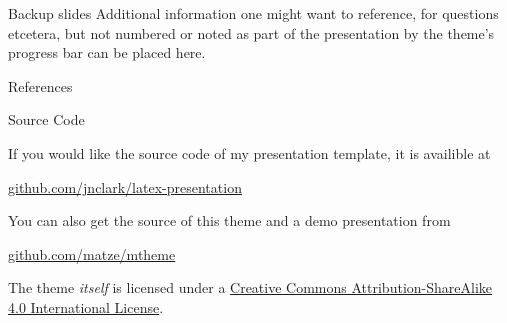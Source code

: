 \documentclass[10pt]{beamer}
\begin{document}
\appendix

\begin{frame}[fragile]{Backup slides}
  Additional information one might want to reference, for questions etcetera, but not numbered or noted as part of the presentation by the theme's progress bar can be placed here.
\end{frame}

\begin{frame}[allowframebreaks]{References}

  
  

\end{frame}

\begin{frame}{Source Code}

  If you would like the source code of my presentation template, it is availible at 

\begin{center}\url{github.com/jnclark/latex-presentation}\end{center}

  You can also get the source of this theme and a demo presentation from

  \begin{center}\url{github.com/matze/mtheme}\end{center}

  The theme \emph{itself} is licensed under a
  \href{http://creativecommons.org/licenses/by-sa/4.0/}{Creative Commons
  Attribution-ShareAlike 4.0 International License}.

  \begin{center}\ccbysa\end{center}

\end{frame}
\end{document}
